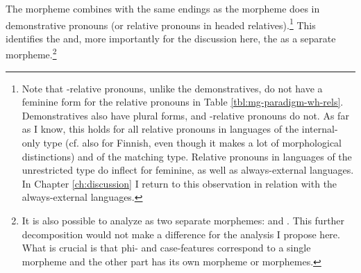 The morpheme  combines with the same endings as the morpheme  does in demonstrative pronouns (or relative pronouns in headed relatives).\footnote{
Note that -relative pronouns, unlike the demonstratives, do not have a feminine form for the relative pronouns in Table \ref{tbl:mg-paradigm-wh-rels}. Demonstratives also have plural forms, and -relative pronouns do not. As far as I know, this holds for all relative pronouns in languages of the internal-only type (cf. also for Finnish, even though it makes a lot of morphological distinctions) and of the matching type. Relative pronouns in languages of the unrestricted type do inflect for feminine, as well as always-external languages. In Chapter \ref{ch:discussion} I return to this observation in relation with the always-external languages.}
This identifies the  and, more importantly for the discussion here, the  as a separate morpheme.\footnote{
It is also possible to analyze  as two separate morphemes:  and . This further decomposition would not make a difference for the analysis I propose here. What is crucial is that phi- and case-features correspond to a single morpheme and the other part has its own morpheme or morphemes.
}
